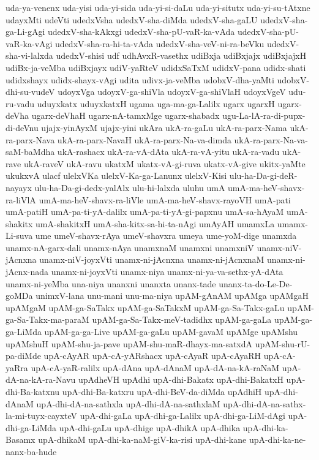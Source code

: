 {uda-ya-venenx
uda-yisi
uda-yi-sida
uda-yi-si-daLu
uda-yi-situtx
uda-yi-su-tAtxne
udayxMti
udeVti
udedxVsha
udedxV-sha-diMda
udedxV-sha-gaLU
udedxV-sha-ga-Li-gAgi
udedxV-sha-kAkxgi
udedxV-sha-pU-vaR-ka-vAda
udedxV-sha-pU-vaR-ka-vAgi
udedxV-sha-ra-hi-ta-vAda
udedxV-sha-veV-ni-ra-beVku
udedxV-sha-vi-lalxda
udedxV-shisi
udf
udhAvxR-vasethx
udiBxja
udiBxjajx
udiBxjajxH
udiBx-ja-veMba
udiBxjayx
udiV-yaRteV
udidxSaTxM
udidxV-pana
udidx-shati
udidxshayx
udidx-shayx-vAgi
udita
udivx-ja-veMba
udobxV-dha-yaMti
udobxV-dhi-su-vudeV
udoyxVga
udoyxV-ga-shiVla
udoyxV-ga-shiVlaH
udoyxVgeV
udu-ru-vadu
uduyxkatx
uduyxkatxH
ugama
uga-ma-ga-Lalilx
ugarx
ugarxH
ugarx-deVha
ugarx-deVhaH
ugarx-nA-tamxMge
ugarx-shabadx
ugu-La-lA-ra-di-pupx-di-deVnu
ujajx-yinAyxM
ujajx-yini
ukAra
ukA-ra-gaLu
ukA-ra-parx-Nama
ukA-ra-parx-Nava
ukA-ra-parx-NavaH
ukA-ra-parx-Na-va-dimda
ukA-ra-parx-Na-va-saM-baMdha
ukA-rashacx
ukA-ra-vA-dAta
ukA-ra-vA-yitu
ukA-ra-vadu
ukA-rave
ukA-raveV
ukA-ravu
ukatxM
ukatx-vA-gi-ruva
ukatx-vA-give
ukitx-yaMte
ukukxvA
ulacf
ulelxVKa
ulelxV-Ka-ga-Lanunx
ulelxV-Kisi
ulu-ha-Da-gi-deR-nayayx
ulu-ha-Da-gi-dedx-yalAlx
ulu-hi-lalxda
uluhu
umA
umA-ma-heV-shavx-ra-liVlA
umA-ma-heV-shavx-ra-liVle
umA-ma-heV-shavx-rayoVH
umA-pati
umA-patiH
umA-pa-ti-yA-dalilx
umA-pa-ti-yA-gi-papxnu
umA-sa-hAyaM
umA-shakitx
umA-shakitxH
umA-sha-kitx-sa-hi-ta-nAgi
umAyAH
umamxLa
umamx-Li-suva
ume
umeV-shavx-rAya
umeV-shavxra
umeya
ume-yoM-dige
unamxda
unamx-nA-garx-dali
unamx-nAya
unamxnaM
unamxni
unamxniV
unamx-niV-jAcnxna
unamx-niV-joyxVti
unamx-ni-jAcnxna
unamx-ni-jAcnxnaM
unamx-ni-jAcnx-nada
unamx-ni-joyxVti
unamx-niya
unamx-ni-ya-va-sethx-yA-dAta
unamx-ni-yeMba
una-niya
unanxni
unanxta
unanx-tade
unanx-ta-do-Le-De-goMDa
unimxV-lana
unu-mani
unu-ma-niya
upAM-gAnAM
upAMga
upAMgaH
upAMgaM
upAM-ga-SaTakx
upAM-ga-SaTakxM
upAM-ga-Sa-Takx-gaLu
upAM-ga-Sa-Takx-ma-paraM
upAM-ga-Sa-Takx-meV-tadidhx
upAM-ga-gaLa
upAM-ga-ga-LiMda
upAM-ga-ga-Live
upAM-ga-gaLu
upAM-gavaM
upAMge
upAMshu
upAMshuH
upAM-shu-ja-pave
upAM-shu-maR-dhayx-ma-satxdA
upAM-shu-rU-pa-diMde
upA-cAyAR
upA-cA-yARshacx
upA-cAyaR
upA-cAyaRH
upA-cA-yaRra
upA-cA-yaR-ralilx
upA-dAna
upA-dAnaM
upA-dA-na-kA-raNaM
upA-dA-na-kA-ra-Navu
upAdheVH
upAdhi
upA-dhi-Bakatx
upA-dhi-BakatxH
upA-dhi-Ba-katxnu
upA-dhi-Ba-katxru
upA-dhi-BeV-da-diMda
upAdhiH
upA-dhi-dAnaM
upA-dhi-dA-na-sathxla
upA-dhi-dA-na-sathxlaM
upA-dhi-dA-na-sathx-la-mi-tuyx-cayxteV
upA-dhi-gaLa
upA-dhi-ga-Lalilx
upA-dhi-ga-LiM-dAgi
upA-dhi-ga-LiMda
upA-dhi-gaLu
upA-dhige
upA-dhikA
upA-dhika
upA-dhi-ka-Basamx
upA-dhikaM
upA-dhi-ka-naM-giV-ka-risi
upA-dhi-kane
upA-dhi-ka-ne-nanx-ba-hude
}

